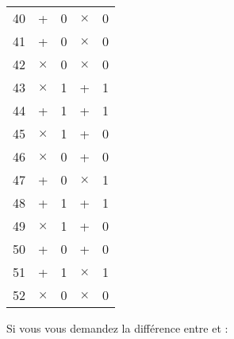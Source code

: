 \begin{longtable}{c|cc|cc}
    40     & +                          & 0                       & $\times$ & 0   \\
    41     & +                          & 0                       & $\times$ & 0   \\
    42     & $\times$                   & 0                       & $\times$ & 0   \\
    43     & $\times$                   & 1                       & +        & 1   \\
    44     & +                          & 1                       & +        & 1   \\
    45     & $\times$                   & 1                       & +        & 0   \\
    46     & $\times$                   & 0                       & +        & 0   \\
    47     & +                          & 0                       & $\times$ & 1   \\
    48     & +                          & 1                       & +        & 1   \\
    49     & $\times$                   & 1                       & +        & 0   \\
    50     & +                          & 0                       & +        & 0   \\
    51     & +                          & 1                       & $\times$ & 1   \\
    52     & $\times$                   & 0                       & $\times$ & 0   \\ \hline
    \bottomrule
  \end{longtable}

Si vous vous demandez la différence entre  et  : 